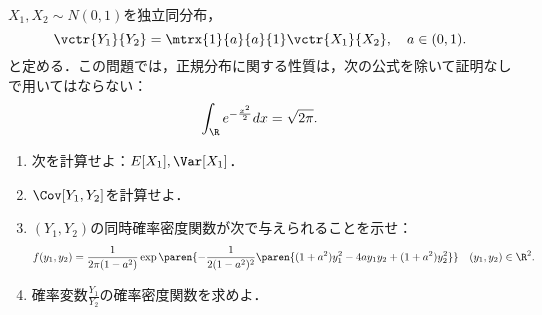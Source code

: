 \documentclass[uplatex,dvipdfmx]{jsarticle}
\begin{document}
\begin{tcolorbox}[colframe=ForestGreen, colback=ForestGreen!10!white,breakable,colbacktitle=ForestGreen!40!white,coltitle=black,fonttitle=\bfseries\sffamily,
    title=第４問]
    $X_1,X_2\sim N(0,1)$を独立同分布，
    \[\vctr{Y_1}{Y_2}=\mtrx{1}{a}{a}{1}\vctr{X_1}{X_2},\quad a\in(0,1).\]
    と定める．この問題では，正規分布に関する性質は，次の公式を除いて証明なしで用いてはならない：
    \[\int_\R e^{-\frac{x^2}{2}}dx=\sqrt{2\pi}.\]
    \begin{enumerate}
        \item 次を計算せよ：$E[X_1],\Var[X_1]$．
        \item $\Cov[Y_1,Y_2]$を計算せよ．
        \item $(Y_1,Y_2)$の同時確率密度関数が次で与えられることを示せ：
        \[f(y_1,y_2)=\frac{1}{2\pi(1-a^2)}\exp\paren{-\frac{1}{2(1-a^2)^2}\paren{(1+a^2)y_1^2-4ay_1y_2+(1+a^2)y^2_2}}\quad(y_1,y_2)\in\R^2.\]
        \item 確率変数$\frac{Y_1}{Y_2}$の確率密度関数を求めよ．
    \end{enumerate}
\end{tcolorbox}
\end{document}

